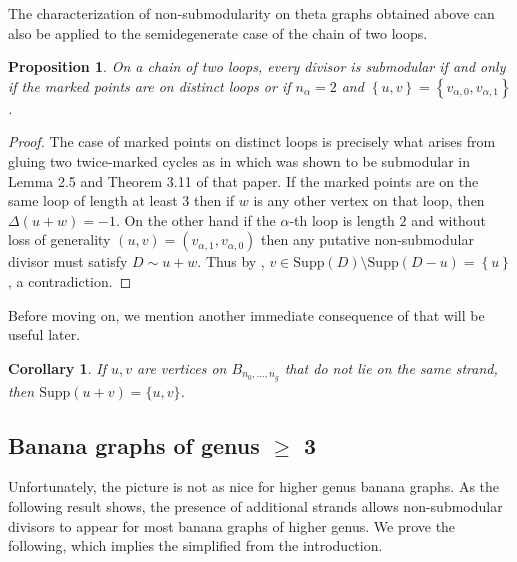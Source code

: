 \documentclass[11pt]{article}
\newtheorem{prop}[theo]{Proposition}
\newtheorem{coro}[theo]{Corollary}
\theoremstyle{definition}
\numberwithin{equation}{section}
\newcommand{\Supp}{\mathrm{Supp}}
\newcommand{\set}[1]{\left\{{#1}\right\}}
\begin{document}
The characterization of non-submodularity on theta graphs obtained above can also be applied to the semidegenerate case of the chain of two loops. 

\begin{prop}\label{rem-degenerateTheta}
    On a chain of two loops, every divisor is submodular if and only if the marked points are on distinct loops or if $n_\alpha = 2$ and $\set{u,v} = \set{v_{\alpha,0},v_{\alpha,1}}$.
\end{prop}

\begin{proof}
    The case of marked points on distinct loops is precisely what arises from gluing two twice-marked cycles as in \cite{Pfl22} which was shown to be submodular in Lemma 2.5 and Theorem 3.11 of that paper. If the marked points are on the same loop of length at least $3$ then if $w$ is any other vertex on that loop, then $\Delta(u+w) = -1$. On the other hand if the $\alpha$-th loop is length $2$ and without loss of generality $(u,v) = (v_{\alpha,1},v_{\alpha,0})$ then any putative non-submodular divisor must satisfy $D \sim u+w$. Thus by , $v \in \Supp(D)\setminus \Supp(D-u) = \set{u}$, a contradiction. 
\end{proof}

Before moving on, we mention another immediate consequence of  that will be useful later.

\begin{coro}\label{cor:suppUV}
If $u,v$ are vertices on $B_{n_0, \ldots, n_g}$ that do not lie on the same strand, then $\Supp(u+v) = \{u,v\}$.
\end{coro}

\subsection{Banana graphs of genus \texorpdfstring{$\geq$}{≥} 3}
Unfortunately, the picture is not as nice for higher genus banana graphs. As the following result shows, the presence of additional strands allows non-submodular divisors to appear for most banana graphs of higher genus. We prove the following, which implies the simplified  from the introduction.
\end{document}
